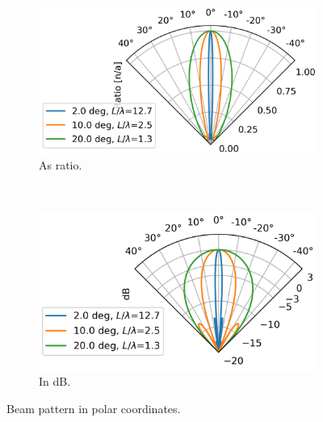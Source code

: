 \documentclass[11pt]{article}
\begin{document}
\begin{figure}[hb!]
  \centering
  \begin{subfigure}[t]{0.5\textwidth}
    \centering
    \includegraphics[width=\textwidth]{src/single_beam/linebp_polar_ratio_c.png}
    \caption{As ratio.}
  \end{subfigure}%
  ~ 
  \begin{subfigure}[t]{0.5\textwidth}
    \centering
    \includegraphics[width=\textwidth]{src/single_beam/linebp_polar_db_c.png}
    \caption{In dB.}
  \end{subfigure}
  \caption{Beam pattern in polar coordinates. }
  \label{f:linebp_polar}
\end{figure}
\end{document}
